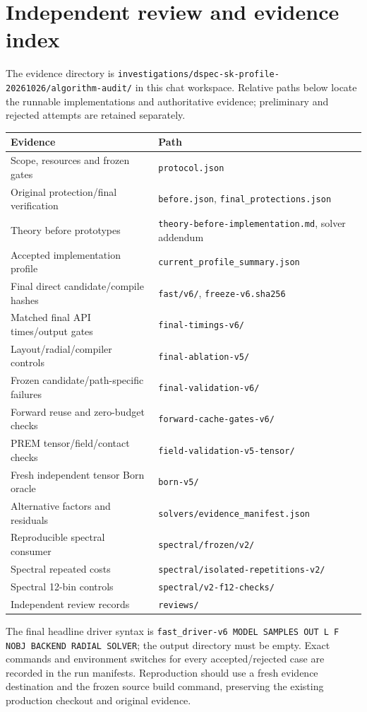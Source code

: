 \section{Independent review and evidence index}

The evidence directory is \texttt{investigations/dspec-sk-profile-20261026/algorithm-audit/} in this chat workspace. Relative paths below locate the runnable implementations and authoritative evidence; preliminary and rejected attempts are retained separately.
\begin{center}
\small
\begin{tabular}{p{}p{}}
\toprule
Evidence & Path\\
\midrule
Scope, resources and frozen gates & \texttt{protocol.json}\\
Original protection/final verification & \texttt{before.json}, \texttt{final\_protections.json}\\
Theory before prototypes & \texttt{theory-before-implementation.md}, solver addendum\\
Accepted implementation profile & \texttt{current\_profile\_summary.json}\\
Final direct candidate/compile hashes & \texttt{fast/v6/}, \texttt{freeze-v6.sha256}\\
Matched final API times/output gates & \texttt{final-timings-v6/}\\
Layout/radial/compiler controls & \texttt{final-ablation-v5/}\\
Frozen candidate/path-specific failures & \texttt{final-validation-v6/}\\
Forward reuse and zero-budget checks & \texttt{forward-cache-gates-v6/}\\
PREM tensor/field/contact checks & \texttt{field-validation-v5-tensor/}\\
Fresh independent tensor Born oracle & \texttt{born-v5/}\\
Alternative factors and residuals & \texttt{solvers/evidence\_manifest.json}\\
Reproducible spectral consumer & \texttt{spectral/frozen/v2/}\\
Spectral repeated costs & \texttt{spectral/isolated-repetitions-v2/}\\
Spectral 12-bin controls & \texttt{spectral/v2-f12-checks/}\\
Independent review records & \texttt{reviews/}\\
\bottomrule
\end{tabular}
\end{center}
The final headline driver syntax is \texttt{fast\_driver-v6 MODEL SAMPLES OUT L F NOBJ BACKEND RADIAL SOLVER}; the output directory must be empty. Exact commands and environment switches for every accepted/rejected case are recorded in the run manifests. Reproduction should use a fresh evidence destination and the frozen source build command, preserving the existing production checkout and original evidence.
